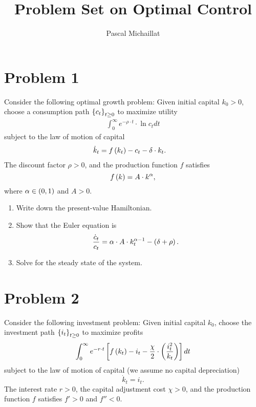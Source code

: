 \documentclass[letterpaper,12pt,leqno]{article}
\begin{document}
\title{Problem Set on Optimal Control}
\author{Pascal Michaillat}
\date{}

\begin{titlepage}
\maketitle
\end{titlepage}

\section*{Problem 1}

Consider the following optimal growth problem: Given initial capital $k_{0}>0$, choose a consumption path $\left\lbrace c_{t} \right\rbrace_{t\geq 0}$ to maximize utility
\begin{align*}
\int_{0}^{\infty}e^{-\rho\cdot  t} \cdot \ln{c_{t}} dt 
\end{align*}
subject to the law of motion of capital
\begin{align*}
\dot{k}_{t} &=f\left( k_{t} \right) -c_{t}-\delta \cdot k_{t}.
\end{align*}
The discount factor $\rho>0$, and the production function $f$ satisfies
 \[f\left( k \right) =A\cdot k^{\alpha},\]
 where  $\alpha \in \left( 0,1 \right)$ and $A>0$.

\begin{enumerate}
\item Write down the present-value Hamiltonian.
\item Show that the Euler equation is
\begin{align*}
\frac{\dot{c}_{t}}{c_{t}} &=\alpha \cdot  A \cdot k_{t}^{\alpha -1}-\left( \delta +\rho \right).
\end{align*}

\item Solve for the steady state of the system.
\end{enumerate}

\section*{Problem 2}

Consider the following investment problem: Given initial capital $k_{0}$, choose the investment path $\left\lbrace i_{t} \right\rbrace _{t \geq 0}$ to maximize profits
\begin{align*}
\int_{0}^{\infty} e^{-r\cdot t}\left[ f\left( k_{t} \right) -i_{t}-\frac{\chi}{2}\cdot \left( \frac{i_{t}^{2}}{k_{t}} \right) \right] dt 
\end{align*}
subject to the law of motion of capital (we assume no capital depreciation)
\[\dot{k}_{t} =i_{t}.\]
The interest rate $r>0$, the capital adjustment cost $\chi>0$, and the production function $f$ satisfies $f'>0$ and $f''<0$.
\end{document}
